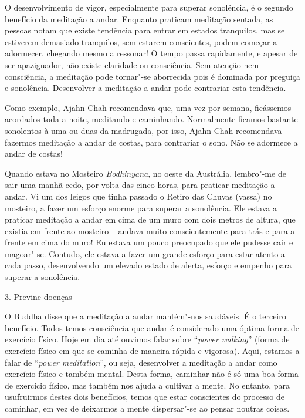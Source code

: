 O desenvolvimento de vigor, especialmente para superar sonolência, é o
segundo benefício da meditação a andar. Enquanto praticam meditação
sentada, as pessoas notam que existe tendência para entrar em estados
tranquilos, mas se estiverem demasiado tranquilos, sem estarem conscientes,
podem começar a adormecer, chegando mesmo a ressonar! O tempo passa
rapidamente, e apesar de ser apaziguador, não existe claridade ou
consciência. Sem atenção nem consciência, a meditação pode
tornar"-se aborrecida pois é dominada por preguiça e sonolência.
Desenvolver a meditação a andar pode contrariar esta tendência.

Como exemplo, Ajahn Chah recomendava que, uma vez por semana,
ficássemos acordados toda a noite, meditando e caminhando. Normalmente
ficamos bastante sonolentos à uma ou duas da madrugada, por isso,
Ajahn Chah recomendava fazermos meditação a andar de costas, para
contrariar o sono. Não se adormece a andar de costas!

Quando estava no Mosteiro \emph{Bodhinyana}, no oeste da Austrália,
lembro"-me de sair uma manhã cedo, por volta das cinco horas, para
praticar meditação a andar. Vi um dos leigos que tinha passado o Retiro
das Chuvas (vassa) no mosteiro, a fazer um esforço enorme para superar a
sonolência. Ele estava a praticar meditação a andar em cima de um muro
com dois metros de altura, que existia em frente ao mosteiro -- andava
muito conscientemente para trás e para a frente em cima do muro! Eu estava
um pouco preocupado que ele pudesse cair e magoar"-se. Contudo, ele
estava a fazer um grande esforço para estar atento a cada passo,
desenvolvendo um elevado estado de alerta, esforço e empenho para
superar a sonolência.

\begin{siderule-quote}
  3. Previne doenças
\end{siderule-quote}

O Buddha disse que a meditação a andar mantém"-nos saudáveis. É o
terceiro benefício. Todos temos consciência que andar é considerado uma
óptima forma de exercício físico. Hoje em dia até ouvimos falar sobre
``\emph{power walking}'' (forma de exercício físico em que se caminha de
maneira rápida e vigorosa). Aqui, estamos a falar de ``\emph{power
meditation}'', ou seja, desenvolver a meditação a andar como exercício
físico e também mental. Desta forma, caminhar não é só uma boa forma de
exercício físico, mas também nos ajuda a cultivar a mente. No entanto,
para usufruirmos destes dois benefícios, temos que estar conscientes do processo de caminhar, em vez de deixarmos a mente dispersar"-se ao pensar
noutras coisas.

